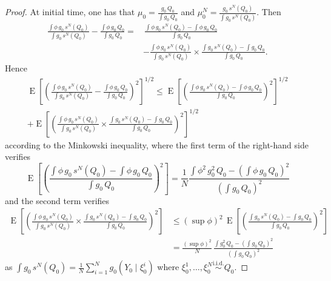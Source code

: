 \documentclass{article}
\newcommand{\simiid}{\overset{\text{i.i.d.}}{\sim}}
\DeclareMathOperator{\E}{E}
\begin{document}
\begin{proof}
    At initial time, one has that $\displaystyle \mu_0 = \frac{g_0 \, Q_0}{\int g_0 \, Q_0}$ and $\displaystyle \mu^N_0 = \frac{g_0 \, s^N(Q_0)}{\int g_0 \, s^N(Q_0)}$. Then
    \begin{align*}
        \frac{\int \phi \, g_0 \, s^N(Q_0)}{\int g_0 \, s^N(Q_0)} - \frac{\int \phi \, g_0 \, Q_0}{\int g_0 \, Q_0} = & \, \frac{\int \phi \, g_0 \, s^N(Q_0) - \int \phi \, g_0 \, Q_0}{\int g_0 \, Q_0} \\
        &- \frac{\int \phi \, g_0 \, s^N(Q_0)}{\int g_0 \, s^N(Q_0)} \times \frac{\int g_0 \, s^N(Q_0) - \int g_0 \, Q_0}{\int g_0 \, Q_0}.
    \end{align*}
    Hence
    \begin{multline*}
        \E[(\frac{\int \phi \, g_0 \, s^N(Q_0)}{\int g_0 \, s^N(Q_0)} - \frac{\int \phi \, g_0 \, Q_0}{\int g_0 \, Q_0})^2]^{1/2} \leq \E[(\frac{\int \phi \, g_0 \, s^N(Q_0) - \int \phi \, g_0 \, Q_0}{\int g_0 \, Q_0})^2]^{1/2} \\
        + \E[(\frac{\int \phi \, g_0 \, s^N(Q_0)}{\int g_0 \, s^N(Q_0)} \times \frac{\int g_0 \, s^N(Q_0) - \int g_0 \, Q_0}{\int g_0 \, Q_0})^2]^{1/2}
    \end{multline*}
    according to the Minkowski inequality, where the first term of the right-hand side verifies
    \begin{equation*}
        \E[(\frac{\int \phi \, g_0 \, s^N(Q_0) - \int \phi \, g_0 \, Q_0}{\int g_0 \, Q_0})^2] = \frac 1N \frac{\int \phi^2 \, g_0^2 \, Q_0 - (\int \phi \, g_0 \, Q_0)^2}{(\int g_0 \, Q_0)^2}
    \end{equation*}
    and the second term verifies
    \begin{align*}
        \E[(\frac{\int \phi \, g_0 \, s^N(Q_0)}{\int g_0 \, s^N(Q_0)} \times \frac{\int g_0 \, s^N(Q_0) - \int g_0 \, Q_0}{\int g_0 \, Q_0})^2] &\leq (\sup \phi)^2 \, \E[(\frac{\int g_0 \, s^N(Q_0) - \int g_0 \, Q_0}{\int g_0 \, Q_0})^2] \\
        &= \frac{(\sup \phi)^2}{N} \, \frac{\int g_0^2 \, Q_0 - (\int g_0 \, Q_0)^2}{(\int g_0 \, Q_0)^2}
    \end{align*}
    as $\displaystyle \int g_0 \, s^N(Q_0) = \frac 1N \sum_{i=1}^N g_0(Y_0 \mid \xi^i_0)$ where $\xi^1_0,\dots,\xi^N_0 \simiid Q_0$.


\end{proof}
\end{document}
